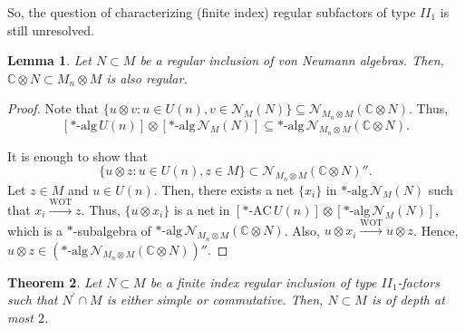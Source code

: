 \documentclass{amsart}
\newtheorem{theorem}{Theorem}[section]
\newtheorem{lemma}[theorem]{Lemma}
\theoremstyle{definition}
\theoremstyle{theorem}
\newcommand{\C}{\mathbb{C}}
\begin{document}
So, the
question of characterizing (finite index) regular subfactors of type
$II_1$ is still unresolved.\color{black}

\begin{lemma}\label{tensor}
 Let $N\subset M$ be a regular inclusion of von Neumann
 algebras. Then, $\C \otimes N\subset M_n \otimes M$ is also regular.
\end{lemma}

\begin{proof}
Note that $\{ u \otimes v: u \in U(n), v \in \mathcal{N}_M(N)\}
\subseteq \mathcal{N}_{M_n \otimes M}(\C \otimes N)$. Thus,
\[
[*\text{-alg}\, U(n)] \otimes [*\text{-alg}\, \mathcal{N}_M(N) ] \subseteq
*\text{-alg}\, \mathcal{N}_{M_n \otimes M} (\C \otimes N).
\]

It is enough to show that
\[
\{ u \otimes z: u \in U(n), z \in   M\} 
\subset \mathcal{N}_{M_n \otimes M} (\C \otimes N)''.
\]
Let $z \in M$ and $u \in U(n)$. Then, there exists a net $\{x_i\}$ in
$*\text{-alg}\, \mathcal{N}_M(N)$ such that $x_i
\stackrel{\mathrm{WOT}}{\longrightarrow} z$. Thus, $\{u \otimes x_i\}$ is a net
in $ [*\text{-AC}\, U(n)] \otimes [*\text{-alg}\, \mathcal{N}_M(N)
]$, which is a $*$-subalgebra of $*\text{-alg}\, \mathcal{N}_{M_n
  \otimes M} (\C \otimes N)$. Also, $u \otimes x_i
\stackrel{\mathrm{WOT}}{\longrightarrow} u \otimes z$. Hence, $u
\otimes z \in \left(*\text{-alg}\, \mathcal{N}_{M_n \otimes M} (\C
\otimes N)\right)''$.
\end{proof}

 


\begin{theorem}\label{cute}
   Let $N\subset M$ be a finite index regular inclusion of type
   $II_1$-factors such that $N^{\prime}\cap M$ is either simple or
   commutative.  Then, $N\subset M$ is of depth at most $2$.
\end{theorem}
\end{document}
